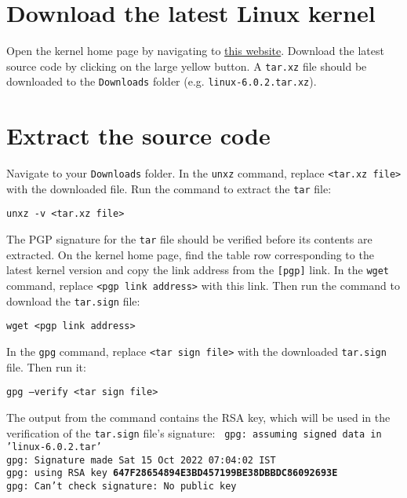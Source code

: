 \documentclass[12pt,a4paper]{report}
\begin{document}
\section{Download the latest Linux kernel}
Open the kernel home page by navigating to \href{https://www.kernel.org/}{this website}. Download the latest source code by clicking on the large yellow button.
\newline
\newline
A \texttt{tar.xz} file should be downloaded to the \texttt{Downloads} folder (e.g. \texttt{\small linux-6.0.2.tar.xz}). 

\section{Extract the source code}
Navigate to your \texttt{Downloads} folder. In the \texttt{unxz} command, replace \texttt{<tar.xz file>} with the downloaded file. Run the command to extract the \texttt{tar} file:
\newline
\newline
\centerline{\texttt{unxz -v <tar.xz file>}}
\newline
\newline 
The PGP signature for the \texttt{tar} file should be verified before its contents are extracted. On the kernel home page, find the table row corresponding to the latest kernel version and copy the link address from the \texttt{[pgp]} link. In the \texttt{wget} command, replace \texttt{<pgp link address>} with this link. Then run the command to download the \texttt{tar.sign} file:
\newline
\newline
\centerline{\texttt{wget <pgp link address>}}
\newline
\newline 
In the \texttt{gpg} command, replace \texttt{<tar sign file>} with the downloaded \texttt{tar.sign} file. Then run it:
\newline
\newline
\centerline{\texttt{gpg --verify <tar sign file>}}
\newline
\newline 
The output from the command contains the RSA key, which will be used in the verification of the \texttt{tar.sign} file's signature:
\newline
\newline
\texttt{
gpg: assuming signed data in 'linux-6.0.2.tar'
\\
gpg: Signature made Sat 15 Oct 2022 07:04:02 IST
\\
gpg:                using RSA key \textbf{647F28654894E3BD457199BE38DBBDC86092693E}
\\
gpg: Can't check signature: No public key
}
\end{document}

